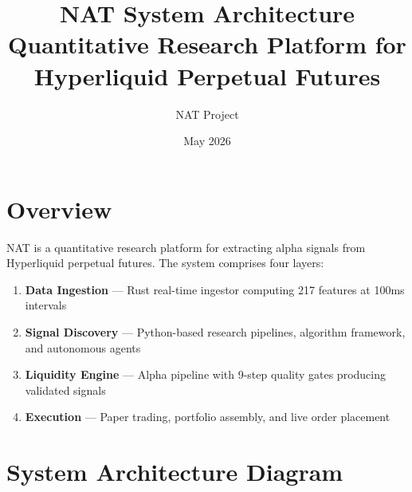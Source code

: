 \documentclass[11pt,a4paper]{article}
\title{\textbf{NAT System Architecture}\\[0.3em]
\large Quantitative Research Platform for Hyperliquid Perpetual Futures}
\author{NAT Project}
\date{May 2026}
\begin{document}
\maketitle

\section{Overview}

NAT is a quantitative research platform for extracting alpha signals from Hyperliquid perpetual futures. The system comprises four layers:

\begin{enumerate}
    \item \textbf{Data Ingestion} --- Rust real-time ingestor computing 217 features at 100ms intervals
    \item \textbf{Signal Discovery} --- Python-based research pipelines, algorithm framework, and autonomous agents
    \item \textbf{Liquidity Engine} --- Alpha pipeline with 9-step quality gates producing validated signals
    \item \textbf{Execution} --- Paper trading, portfolio assembly, and live order placement
\end{enumerate}

\section{System Architecture Diagram}
\end{document}
